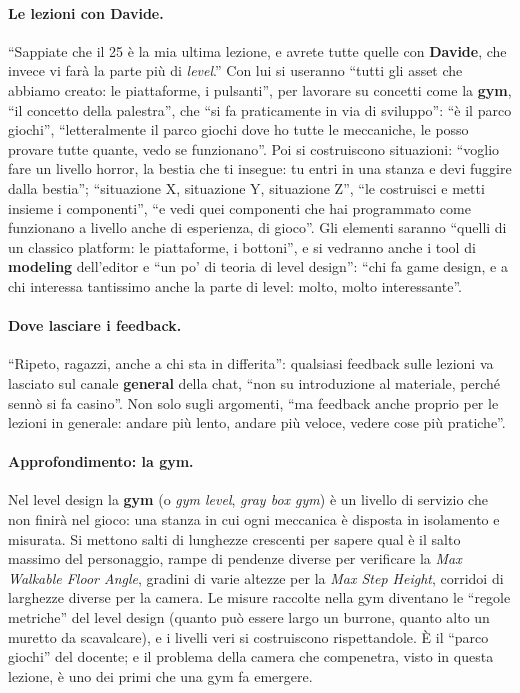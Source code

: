 \paragraph{Le lezioni con Davide.} ``Sappiate che il 25 è la mia ultima lezione, e avrete
tutte quelle con \textbf{Davide}, che invece vi farà la parte più di \emph{level}.'' Con
lui si useranno ``tutti gli asset che abbiamo creato: le piattaforme, i pulsanti'', per
lavorare su concetti come la \textbf{gym}, ``il concetto della palestra'', che ``si fa
praticamente in via di sviluppo'': ``è il parco giochi'', ``letteralmente il parco giochi
dove ho tutte le meccaniche, le posso provare tutte quante, vedo se funzionano''. Poi si
costruiscono situazioni: ``voglio fare un livello horror, la bestia che ti insegue: tu
entri in una stanza e devi fuggire dalla bestia''; ``situazione X, situazione Y,
situazione Z'', ``le costruisci e metti insieme i componenti'', ``e vedi quei componenti
che hai programmato come funzionano a livello anche di esperienza, di gioco''. Gli
elementi saranno ``quelli di un classico platform: le piattaforme, i bottoni'', e si
vedranno anche i tool di \textbf{modeling} dell'editor e ``un po' di teoria di level
design'': ``chi fa game design, e a chi interessa tantissimo anche la parte di level:
molto, molto interessante''.

\paragraph{Dove lasciare i feedback.} ``Ripeto, ragazzi, anche a chi sta in differita'':
qualsiasi feedback sulle lezioni va lasciato sul canale \textbf{general} della chat,
``non su introduzione al materiale, perché sennò si fa casino''. Non solo sugli
argomenti, ``ma feedback anche proprio per le lezioni in generale: andare più lento,
andare più veloce, vedere cose più pratiche''.

\paragraph{Approfondimento: la gym.} Nel level design la \textbf{gym} (o \emph{gym
level}, \emph{gray box gym}) è un livello di servizio che non finirà nel gioco: una
stanza in cui ogni meccanica è disposta in isolamento e misurata. Si mettono salti di
lunghezze crescenti per sapere qual è il salto massimo del personaggio, rampe di
pendenze diverse per verificare la \emph{Max Walkable Floor Angle}, gradini di varie
altezze per la \emph{Max Step Height}, corridoi di larghezze diverse per la camera. Le
misure raccolte nella gym diventano le ``regole metriche'' del level design (quanto può
essere largo un burrone, quanto alto un muretto da scavalcare), e i livelli veri si
costruiscono rispettandole. È il ``parco giochi'' del docente; e il problema della
camera che compenetra, visto in questa lezione, è uno dei primi che una gym fa emergere.
